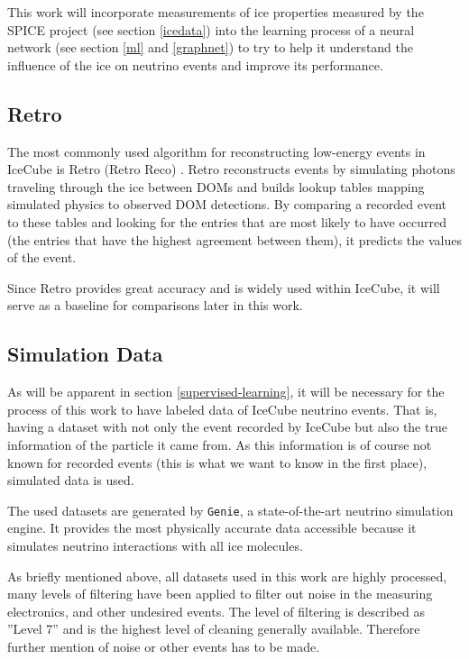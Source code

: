 \documentclass[a4paper,10pt]{scrartcl}
\begin{document}
This work will incorporate measurements of ice properties measured by the SPICE project (see section \ref{icedata}) \cite{1301.5361} into the learning process of a neural network (see section \ref{ml} and \ref{graphnet}) to try to help it understand the influence of the ice on neutrino events and improve its performance.

\subsection{Retro}

The most commonly used algorithm for reconstructing low-energy events in IceCube is Retro (Retro Reco) \cite{retro}.
Retro reconstructs events by simulating photons traveling through the ice between DOMs and builds lookup tables mapping simulated physics to observed DOM detections.
By comparing a recorded event to these tables and looking for the entries that are most likely to have occurred (the entries that have the highest agreement between them), it predicts the values of the event.

Since Retro provides great accuracy and is widely used within IceCube, it will serve as a baseline for comparisons later in this work.

\subsection{Simulation Data}

As will be apparent in section \ref{supervised-learning}, it will be necessary for the process of this work to have labeled data of IceCube neutrino events.
That is, having a dataset with not only the event recorded by IceCube but also the true information of the particle it came from.
As this information is of course not known for recorded events (this is what we want to know in the first place), simulated data is used.

The used datasets are generated by \texttt{Genie}, a state-of-the-art neutrino simulation engine.
It provides the most physically accurate data accessible because it simulates neutrino interactions with all ice molecules.

As briefly mentioned above, all datasets used in this work are highly processed, many levels of filtering have been applied to filter out noise in the measuring electronics, and other undesired events.
The level of filtering is described as ''Level 7'' \cite{rasmus-master} and is the highest level of cleaning generally available.
Therefore further mention of noise or other events has to be made.
\end{document}
